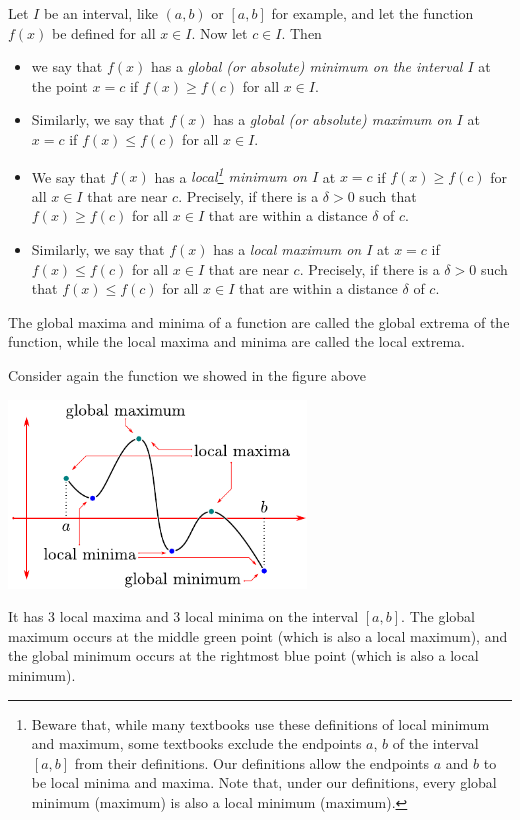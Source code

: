 \begin{defn}\label{def:APPlocalMaxMin} %
Let $I$ be an interval, like $(a,b)$ or $[a,b]$ for example, and let the function $f(x)$ be defined for all $x \in I$. Now let $c\in I$. Then
\begin{itemize}
\item we say that $f(x)$ has a \emph{global (or absolute)
minimum on the interval $I$} at the point $x=c$ if $f(x)\ge f(c)$ for all $x\in I$.

\item Similarly, we say that $f(x)$ has a \emph{global (or absolute)
maximum on $I$} at $x=c$ if $f(x)\le f(c)$ for all $x\in I$.

\item We say that $f(x)$ has a \emph{local\footnote{Beware that, while many textbooks use these definitions of local minimum and maximum, some textbooks exclude the endpoints $a$, $b$ of the interval $[a,b]$ from their definitions. Our definitions allow the endpoints $a$ and $b$ to be local minima and maxima.
Note that, under our definitions, every global minimum (maximum) is also a local minimum (maximum).} minimum on $I$} at $x=c$
if $f(x)\ge f(c)$ for all $x\in I$ that are near $c$. Precisely, if there is a $\delta>0$ such that 
$f(x)\ge f(c)$ for all $x\in I$ that are within a distance $\delta$ of $c$.

\item Similarly, we say that $f(x)$ has a \emph{local maximum on $I$} at $x=c$
if $f(x)\le f(c)$ for all $x\in I$ that are near $c$. Precisely, if there is a $\delta>0$ such that 
$f(x)\le f(c)$ for all $x\in I$ that are within a distance $\delta$ of $c$.
\end{itemize}
The global maxima and minima of a function are called the
global extrema of the function, while the local maxima and minima are called the local
extrema.
\end{defn}

Consider again the function we showed in the figure above
\begin{efig}
 \begin{center}
  \includegraphics[height=5cm]{maxmin3}
 \end{center}
\end{efig}
It has 3 local maxima and 3 local minima on the interval $[a,b]$. The global maximum occurs at 
the middle green point (which is also a local maximum), and the global minimum occurs at the rightmost
blue point (which is also a local minimum).


